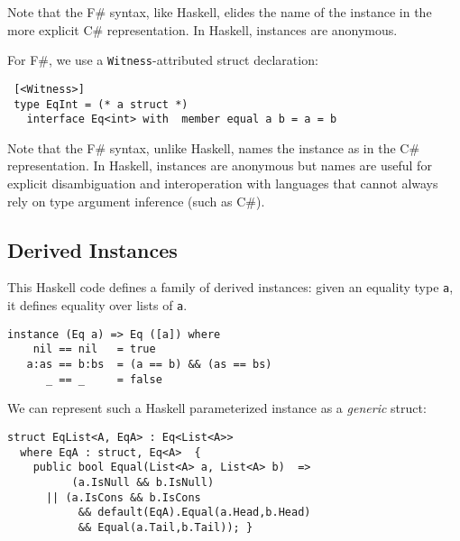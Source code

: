 \documentclass{elsarticle}
\begin{document}
Note that the F\# syntax, like Haskell, elides the name of the instance in the more explicit C\# representation.
In Haskell, instances are anonymous.

\else
For F\#, we use a \lstinline{Witness}-attributed struct declaration:

\begin{lstlisting}
 [<Witness>] 
 type EqInt = (* a struct *)
   interface Eq<int> with  member equal a b = a = b
\end{lstlisting}

Note that the F\# syntax, unlike Haskell, names the instance as in the  C\# representation.
In Haskell, instances are anonymous but names are useful for explicit disambiguation and interoperation with languages that cannot always rely on type argument inference (such as C\#).
\fi

\subsection{Derived Instances}

This Haskell code defines a family of derived instances: given an equality  type \lstinline{a}, it defines equality over lists of \lstinline{a}.
{\small
\begin{lstlisting}
instance (Eq a) => Eq ([a]) where 
    nil == nil   = true
   a:as == b:bs  = (a == b) && (as == bs)
      _ == _     = false
\end{lstlisting}
}

We can represent such a Haskell parameterized instance as a \emph{generic} struct:


\begin{lstlisting}
struct EqList<A, EqA> : Eq<List<A>>
  where EqA : struct, Eq<A>  {
    public bool Equal(List<A> a, List<A> b)  =>
          (a.IsNull && b.IsNull)
      || (a.IsCons && b.IsCons 
           && default(EqA).Equal(a.Head,b.Head) 
           && Equal(a.Tail,b.Tail)); }
\end{lstlisting}
\end{document}
